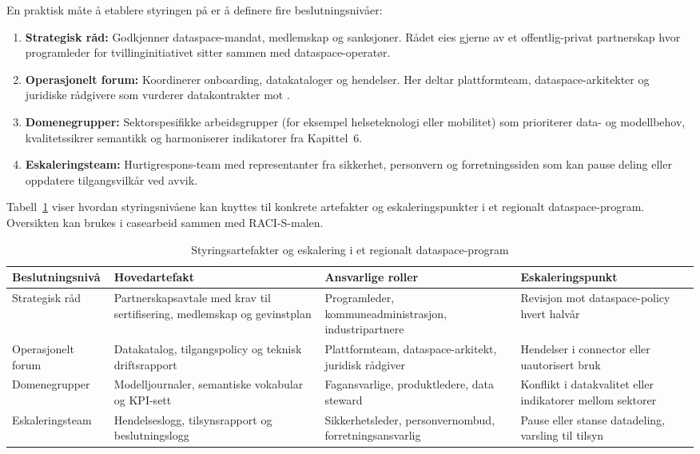 En praktisk måte å etablere styringen på er å definere fire beslutningsnivåer:
\begin{enumerate}
    \item \textbf{Strategisk råd:} Godkjenner dataspace-mandat, medlemskap og sanksjoner. Rådet eies gjerne av et offentlig-privat partnerskap hvor programleder for tvillinginitiativet sitter sammen med dataspace-operatør.
    \item \textbf{Operasjonelt forum:} Koordinerer onboarding, datakataloger og hendelser. Her deltar plattformteam, dataspace-arkitekter og juridiske rådgivere som vurderer datakontrakter mot \citet{digdir2023modelljournal}.
    \item \textbf{Domenegrupper:} Sektorspesifikke arbeidsgrupper (for eksempel helseteknologi eller mobilitet) som prioriterer data- og modellbehov, kvalitetssikrer semantikk og harmoniserer indikatorer fra Kapittel~6.
    \item \textbf{Eskaleringsteam:} Hurtigrespons-team med representanter fra sikkerhet, personvern og forretningssiden som kan pause deling eller oppdatere tilgangsvilkår ved avvik.
\end{enumerate}

Tabell~\ref{tab:dataspace-governance} viser hvordan styringsnivåene kan knyttes til konkrete artefakter og eskaleringspunkter i et regionalt dataspace-program. Oversikten kan brukes i casearbeid sammen med RACI-S-malen.

\begin{table}[h]
    \centering
    \caption{Styringsartefakter og eskalering i et regionalt dataspace-program}
    \label{tab:dataspace-governance}
    \begin{tabular}{p{3.2cm}p{4.2cm}p{4.2cm}p{3.0cm}}
        \toprule
        Beslutningsnivå & Hovedartefakt & Ansvarlige roller & Eskaleringspunkt \\
        \midrule
        Strategisk råd & Partnerskapsavtale med krav til sertifisering, medlemskap og gevinstplan & Programleder, kommuneadministrasjon, industripartnere & Revisjon mot dataspace-policy hvert halvår \\
        Operasjonelt forum & Datakatalog, tilgangspolicy og teknisk driftsrapport & Plattformteam, dataspace-arkitekt, juridisk rådgiver & Hendelser i connector eller uautorisert bruk \\
        Domenegrupper & Modelljournaler, semantiske vokabular og KPI-sett & Fagansvarlige, produktledere, data steward & Konflikt i datakvalitet eller indikatorer mellom sektorer \\
        Eskaleringsteam & Hendelseslogg, tilsynsrapport og beslutningslogg & Sikkerhetsleder, personvernombud, forretningsansvarlig & Pause eller stanse datadeling, varsling til tilsyn \citep{ec2023mobilitydataspace} \\
        \bottomrule
    \end{tabular}
\end{table}

